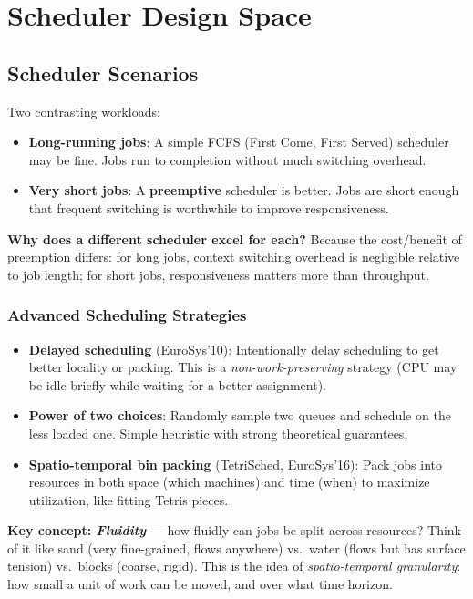 \documentclass[11pt]{article}
\begin{document}
\section{Scheduler Design Space}

\subsection{Scheduler Scenarios}

Two contrasting workloads:
\begin{itemize}
    \item \textbf{Long-running jobs}: A simple FCFS (First Come, First Served) scheduler may be fine. Jobs run to completion without much switching overhead.
    \item \textbf{Very short jobs}: A \textbf{preemptive} scheduler is better. Jobs are short enough that frequent switching is worthwhile to improve responsiveness.
\end{itemize}

\textbf{Why does a different scheduler excel for each?} Because the cost/benefit of preemption differs: for long jobs, context switching overhead is negligible relative to job length; for short jobs, responsiveness matters more than throughput.

\subsubsection*{Advanced Scheduling Strategies}

\begin{itemize}
    \item \textbf{Delayed scheduling} (EuroSys'10): Intentionally delay scheduling to get better locality or packing. This is a \emph{non-work-preserving} strategy (CPU may be idle briefly while waiting for a better assignment).
    \item \textbf{Power of two choices}: Randomly sample two queues and schedule on the less loaded one. Simple heuristic with strong theoretical guarantees.
    \item \textbf{Spatio-temporal bin packing} (TetriSched, EuroSys'16): Pack jobs into resources in both space (which machines) and time (when) to maximize utilization, like fitting Tetris pieces.
\end{itemize}

\textbf{Key concept: \emph{Fluidity}} --- how fluidly can jobs be split across resources? Think of it like sand (very fine-grained, flows anywhere) vs.\ water (flows but has surface tension) vs.\ blocks (coarse, rigid). This is the idea of \emph{spatio-temporal granularity}: how small a unit of work can be moved, and over what time horizon.
\end{document}
